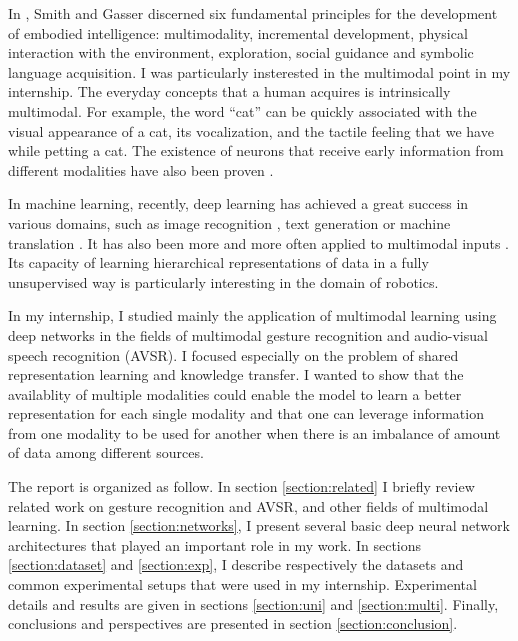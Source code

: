 In \cite{L. Smith 2005}, Smith and Gasser discerned six fundamental
principles for the development of embodied intelligence: multimodality,
incremental development, physical interaction with the environment,
exploration, social guidance and symbolic language acquisition.
I was particularly insterested in the multimodal point in my internship.
The everyday concepts that a human acquires is intrinsically multimodal.
For example, the word ``cat'' can be quickly associated with the visual
appearance of a cat, its vocalization, and the tactile feeling that
we have while petting a cat. The existence of neurons that receive
early information from different modalities have also been proven
\cite{S. Molholm 2002}.

In machine learning, recently, deep learning has achieved a great success in
various domains, such as image recognition \cite{A. Krizhevsky 2012},
text generation \cite{A. Graves 2013} or
machine translation \cite{I. Sutskever 2014}.
It has also been more and more often applied to multimodal inputs
\cite{J. Ngiam 2011, T. Baltrusaitis 2017}.
Its capacity of learning hierarchical representations of data in a
fully unsupervised way \cite{P. Vincent 2010, A. Radford 2015}
is particularly interesting in the domain of robotics.

In my internship, I studied mainly the application of multimodal learning
using deep networks in the fields of multimodal gesture recognition
and audio-visual speech recognition (AVSR).
I focused especially on the problem
of shared representation learning and knowledge transfer. I wanted to show
that the availablity of multiple modalities could enable the model
to learn a better representation for each single modality and that one can
leverage information from one modality to be used for another when there
is an imbalance of amount of data among different sources.

The report is organized as follow. In section \ref{section:related} I
briefly review related work on gesture recognition and AVSR, and other
fields of multimodal learning.
In section \ref{section:networks}, I present
several basic deep neural network architectures that played an important
role in my work. In sections \ref{section:dataset} and
\ref{section:exp}, I describe respectively the datasets and common
experimental setups that were used in my internship. Experimental
details and results are given in sections \ref{section:uni} and
\ref{section:multi}. Finally, conclusions and perspectives are
presented in section \ref{section:conclusion}.

